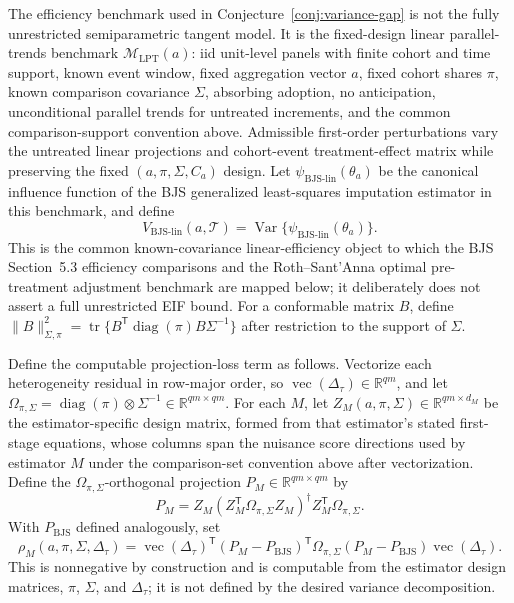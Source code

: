 \documentclass[11pt]{article}
\newcommand{\transpose}{\mathsf{T}}
\newcommand{\R}{\mathbb{R}}
\theoremstyle{definition}
\theoremstyle{plain}
\theoremstyle{remark}
\begin{document}
The efficiency benchmark used in Conjecture~\ref{conj:variance-gap} is not the
fully unrestricted semiparametric tangent model.  It is the fixed-design linear
parallel-trends benchmark \(\mathcal M_{\mathrm{LPT}}(a)\): iid unit-level
panels with finite cohort and time support, known event window, fixed
aggregation vector \(a\), fixed cohort shares \(\pi\), known comparison
covariance \(\Sigma\), absorbing adoption, no anticipation, unconditional
parallel trends for untreated increments, and the common comparison-support
convention above.  Admissible first-order perturbations vary the untreated
linear projections and cohort-event treatment-effect matrix while preserving
the fixed \((a,\pi,\Sigma,C_a)\) design.  Let
\(\psi_{\mathrm{BJS}\text{-}\mathrm{lin}}(\theta_a)\) be the canonical
influence function of the BJS generalized least-squares imputation estimator in
this benchmark, and define
\[
V_{\mathrm{BJS}\text{-}\mathrm{lin}}(a,\mathcal T)
=\operatorname{Var}\{\psi_{\mathrm{BJS}\text{-}\mathrm{lin}}(\theta_a)\}.
\]
This is the common known-covariance linear-efficiency object to which the BJS
Section~5.3 efficiency comparisons and the Roth--Sant'Anna optimal
pre-treatment adjustment benchmark are mapped below; it deliberately does not
assert a full unrestricted EIF bound.  For a conformable matrix \(B\), define
\(\|B\|_{\Sigma,\pi}^2=\operatorname{tr}\{B^\transpose \operatorname{diag}(\pi)B\Sigma^{-1}\}\)
after restriction to the support of \(\Sigma\).

Define the computable projection-loss term as follows.  Vectorize each
heterogeneity residual in row-major order, so
\(\operatorname{vec}(\Delta_\tau)\in\R^{qm}\), and let
\(\Omega_{\pi,\Sigma}=\operatorname{diag}(\pi)\otimes\Sigma^{-1}\in\R^{qm\times qm}\).
For each \(M\), let
\(Z_M(a,\pi,\Sigma)\in\R^{qm\times d_M}\) be the estimator-specific design
matrix, formed from that estimator's stated first-stage equations, whose
columns span the nuisance score directions used by estimator \(M\) under the
comparison-set convention above after vectorization.  Define the
\(\Omega_{\pi,\Sigma}\)-orthogonal projection \(P_M\in\R^{qm\times qm}\) by
\[
P_M=Z_M(Z_M^\transpose\Omega_{\pi,\Sigma}Z_M)^\dagger
Z_M^\transpose\Omega_{\pi,\Sigma}.
\]
With \(P_{\mathrm{BJS}}\) defined analogously, set
\[
\rho_M(a,\pi,\Sigma,\Delta_\tau)
=
\operatorname{vec}(\Delta_\tau)^\transpose
(P_M-P_{\mathrm{BJS}})^\transpose\Omega_{\pi,\Sigma}
(P_M-P_{\mathrm{BJS}})
\operatorname{vec}(\Delta_\tau).
\]
This is nonnegative by construction and is computable from the estimator design
matrices, \(\pi\), \(\Sigma\), and \(\Delta_\tau\); it is not defined by the
desired variance decomposition.
\end{document}
